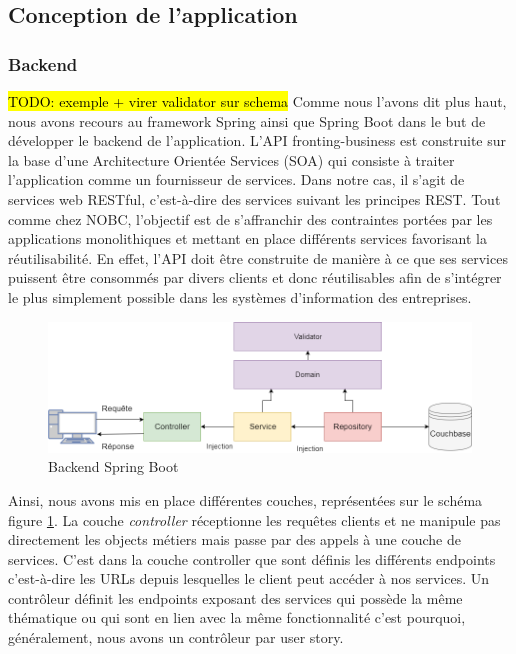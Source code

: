 \subsection{Conception de l'application}

\subsubsection{Backend}
	\hl{TODO: exemple + virer validator sur schema}
	Comme nous l'avons dit plus haut, nous avons recours au framework Spring ainsi que Spring Boot dans le but de développer le backend de l'application. L'API fronting-business est construite sur la base d'une Architecture Orientée Services (SOA) qui consiste à traiter l'application comme un fournisseur de services. Dans notre cas, il s'agit de services web RESTful, c'est-à-dire des services suivant les principes REST. Tout comme chez NOBC, l'objectif est de s'affranchir des contraintes portées par les applications monolithiques et mettant en place différents services favorisant la réutilisabilité. En effet, l'API doit être construite de manière à ce que ses services puissent être consommés par divers clients et donc réutilisables afin de s'intégrer le plus simplement possible dans les systèmes d'information des entreprises. \\
	
\begin{figure}[h!]
	\includegraphics[scale=0.50]{images/travailBP1818/architecture/spring.png}
	\centering
	\caption{Backend Spring Boot}
	\label{spring}
\end{figure}
	
	Ainsi, nous avons mis en place différentes couches, représentées sur le schéma figure \ref{spring}. La couche \textit{controller} réceptionne les requêtes clients et ne manipule pas directement les objects métiers mais passe par des appels à une couche de services. C'est dans la couche controller que sont définis les différents endpoints c'est-à-dire les URLs depuis lesquelles le client peut accéder à nos services. Un contrôleur définit les endpoints exposant des services qui possède la même thématique ou qui sont en lien avec la même fonctionnalité c'est pourquoi, généralement, nous avons un contrôleur par user story. \\
	
